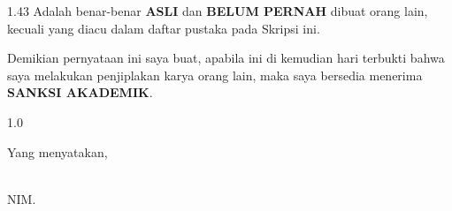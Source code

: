 \begin{spacing}{1.43}
\noindent
Adalah benar-benar \textbf{ASLI} dan \textbf{BELUM PERNAH} dibuat
orang lain, kecuali yang diacu dalam daftar pustaka pada Skripsi
ini.

\noindent
Demikian pernyataan ini saya buat, apabila ini di kemudian hari
terbukti bahwa saya melakukan penjiplakan karya orang lain, maka
saya bersedia menerima \textbf{SANKSI AKADEMIK}.
\end{spacing}

\begin{spacing}{1.0}
\vspace{0.2em}
\noindent\hspace*{5.8cm}%
\begin{minipage}[t]{7.4cm}
  \centering
  \KotaPernyataan

  \vspace{0.2em}
  Yang menyatakan,

  \vspace{0.4em}
  \KotakMaterai

  \vspace{1.0cm}
  \NamaTTD{\NamaMahasiswa}\\
  NIM. \NIM
\end{minipage}
\end{spacing}

\clearpage
